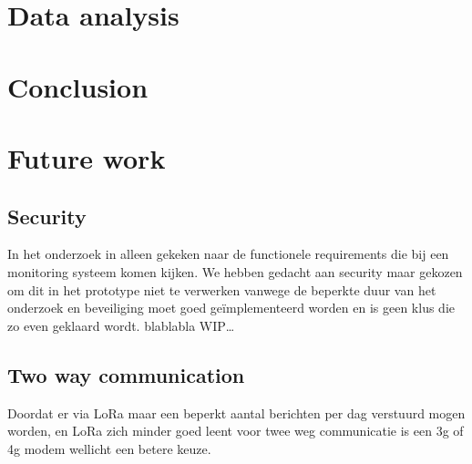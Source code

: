 \documentclass{below-ext}
\begin{document}
\section{Data analysis}
\section{Conclusion}

\section{Future work}
\subsection{Security}
In het onderzoek in alleen gekeken naar de functionele requirements die bij een monitoring systeem komen kijken. We hebben gedacht aan security maar gekozen om dit in het prototype niet te verwerken vanwege de beperkte duur van het onderzoek en beveiliging moet goed geïmplementeerd worden en is geen klus die zo even geklaard wordt. blablabla WIP\ldots
\subsection{Two way communication}
Doordat er via LoRa maar een beperkt aantal berichten per dag verstuurd mogen worden, en LoRa zich minder goed leent voor twee weg communicatie is een 3g of 4g modem wellicht een betere keuze.
\balance


\end{document}
